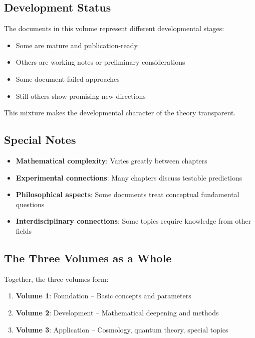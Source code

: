 \subsection*{Development Status}

The documents in this volume represent different developmental stages:

\begin{itemize}
\item Some are mature and publication-ready
\item Others are working notes or preliminary considerations
\item Some document failed approaches
\item Still others show promising new directions
\end{itemize}

This mixture makes the developmental character of the theory transparent.

\subsection*{Special Notes}

\begin{itemize}
\item \textbf{Mathematical complexity}: Varies greatly between chapters
\item \textbf{Experimental connections}: Many chapters discuss testable predictions
\item \textbf{Philosophical aspects}: Some documents treat conceptual fundamental questions
\item \textbf{Interdisciplinary connections}: Some topics require knowledge from other fields
\end{itemize}

\subsection*{The Three Volumes as a Whole}

Together, the three volumes form:

\begin{enumerate}
\item \textbf{Volume 1}: Foundation -- Basic concepts and parameters
\item \textbf{Volume 2}: Development -- Mathematical deepening and methods
\item \textbf{Volume 3}: Application -- Cosmology, quantum theory, special topics
\end{enumerate}

